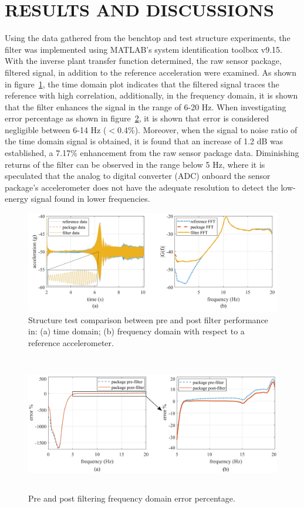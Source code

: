\documentclass[]{spie}  %
\begin{document}
	\section{RESULTS AND DISCUSSIONS}
	Using the data gathered from the benchtop and test structure experiments, the filter was implemented using MATLAB’s system identification toolbox v9.15\cite{MAT2014}. With the inverse plant transfer function determined, the raw sensor package, filtered signal, in addition to the reference acceleration were examined. As shown in figure~\ref{fig:Chrip Structure Test}, the time domain plot indicates that the filtered signal traces the reference with high correlation, additionally, in the frequency domain, it is shown that the filter enhances the signal in the range of 6-20 Hz. When investigating error percentage as shown in figure~\ref{fig:chirp structure error}, it is shown that error is considered negligible between 6-14 Hz ($<$0.4\%). Moreover, when the signal to noise ratio of the time domain signal is obtained, it is found that an increase of 1.2 dB was established, a 7.17\% enhancement from the raw sensor package data. Diminishing returns of the filter can be observed in the range below 5 Hz, where it is speculated that the analog to digital converter (ADC) onboard the sensor package’s accelerometer does not have the adequate resolution to detect the low-energy signal found in lower frequencies.
	
	\begin{figure} [H]
		\centering
		\includegraphics[width=6 in]{figures/Chrip Structure Test.png}
		\caption{Structure test comparison between pre and post filter performance in: (a) time domain; (b) frequency domain with respect to a reference accelerometer.}
		\label{fig:Chrip Structure Test} 
	\end{figure} 
	
	\begin{figure} [H]
		\centering
		\includegraphics[height=6cm]{figures/Chirp Structure Error.png}
		\caption{Pre and post filtering frequency domain error percentage.}
		\label{fig:chirp structure error} 	
	\end{figure} 
\end{document}
